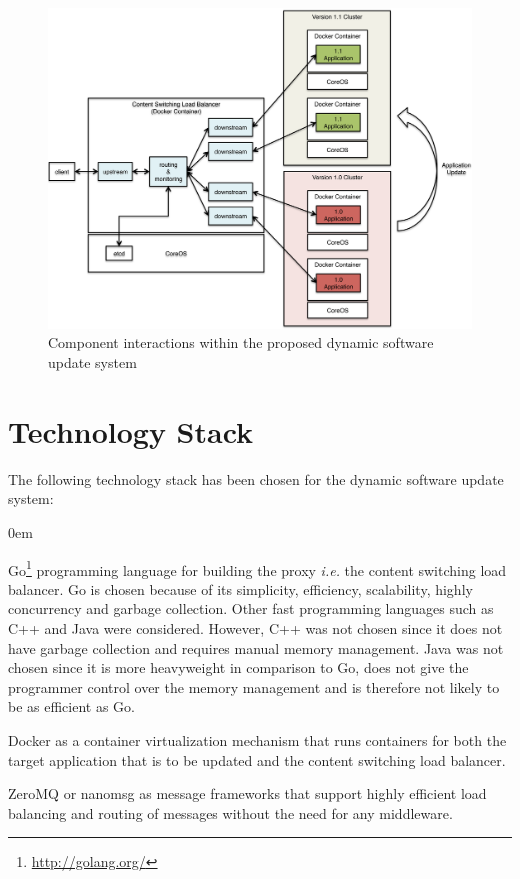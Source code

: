\documentclass[a4paper,11pt,twoside]{report}
\begin{document}
\begin{figure}[!ht]
  \centering
     \includegraphics[scale=0.31]{proposed_solution}
  \caption{Component interactions within the proposed  dynamic software update system}
  \label{proposed_solution}
\end{figure}


\section{Technology Stack} 
The following technology stack has been chosen for the dynamic software update system:

\begin{list}{-}{}
  \itemsep0em
  \item Go\footnote{\url{http://golang.org/}} programming language for building the proxy \textit{i.e.} the content switching load balancer. Go is chosen because of its simplicity, efficiency, scalability, highly concurrency and garbage collection. Other fast programming languages such as C++ and Java were considered. However, C++ was not chosen since it does not have garbage collection and requires manual memory management. Java was not chosen since it is more heavyweight in comparison to Go, does not give the programmer control over the memory management and is therefore not likely to be as efficient as Go.
    
  \item Docker as a container virtualization mechanism that runs containers for both the target application that is to be updated and the content switching load balancer.
  
  \item ZeroMQ or nanomsg as message frameworks that support highly efficient load balancing and routing of messages without the need for any middleware.

    \end{list}
\clearpage
\end{document}
